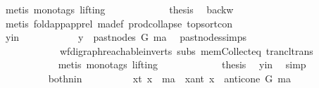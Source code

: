 \begin{isabellebody}
\ {\isacharparenleft}{\kern0pt}metis\ {\isacharparenleft}{\kern0pt}mono{\isacharunderscore}{\kern0pt}tags{\isacharcomma}{\kern0pt}\ lifting{\isacharparenright}{\kern0pt}{\isacharparenright}{\kern0pt}\ \isanewline
\ \ \ \ \ \ \ \ \isamarkupfalse%
\ \isamarkupfalse%
\ {\isacharquery}{\kern0pt}thesis\ \isamarkupfalse%
\ backw\isanewline
\ \ \ \ \ \ \ \ \ \ \isamarkupfalse%
\ {\isacharparenleft}{\kern0pt}metis\ fold{\isacharunderscore}{\kern0pt}app{\isacharunderscore}{\kern0pt}app{\isacharunderscore}{\kern0pt}rel\ ma{\isacharunderscore}{\kern0pt}def\ prod{\isachardot}{\kern0pt}collapse\ top{\isacharunderscore}{\kern0pt}sort{\isacharunderscore}{\kern0pt}con{\isacharparenright}{\kern0pt}\ \isanewline
\ \ \ \ \ \ \isamarkupfalse%
\isanewline
\ \ \ \ \ \ \isamarkupfalse%
\isanewline
\ \ \ \ \ \ \ \ \isamarkupfalse%
\ y{\isacharunderscore}{\kern0pt}in\isanewline
\ \ \ \ \ \ \ \ \isamarkupfalse%
\ \isamarkupfalse%
\ {\isachardoublequoteopen}y\ {\isasymin}\ past{\isacharunderscore}{\kern0pt}nodes\ G\ ma{\isachardoublequoteclose}\ \isamarkupfalse%
\ past{\isacharunderscore}{\kern0pt}nodes{\isachardot}{\kern0pt}simps\ \isamarkupfalse%
\ {}{\isacharparenleft}{\kern0pt}{}{\isacharcomma}{\kern0pt}{}{\isacharparenright}{\kern0pt}\isanewline
\ \ \ \ \ \ \ \ \ \ \ \ wf{\isacharunderscore}{\kern0pt}digraph{\isachardot}{\kern0pt}reachable{}{\isacharunderscore}{\kern0pt}in{\isacharunderscore}{\kern0pt}verts{\isacharparenleft}{\kern0pt}{}{\isacharparenright}{\kern0pt}\ subs\ mem{\isacharunderscore}{\kern0pt}Collect{\isacharunderscore}{\kern0pt}eq\ trancl{\isacharunderscore}{\kern0pt}trans\isanewline
\ \ \ \ \ \ \ \ \ \ \isamarkupfalse%
\ {\isacharparenleft}{\kern0pt}metis\ {\isacharparenleft}{\kern0pt}mono{\isacharunderscore}{\kern0pt}tags{\isacharcomma}{\kern0pt}\ lifting{\isacharparenright}{\kern0pt}{\isacharparenright}{\kern0pt}\ \isanewline
\ \ \ \ \ \ \ \ \isamarkupfalse%
\ \isamarkupfalse%
\ {\isacharquery}{\kern0pt}thesis\ \isamarkupfalse%
\ y{\isacharunderscore}{\kern0pt}in\ \isamarkupfalse%
\ simp\ \isanewline
\ \ \ \ \ \ \isamarkupfalse%
\isanewline
\ \ \ \ \ \ \ \ \isamarkupfalse%
\ both{\isacharunderscore}{\kern0pt}nin\isanewline
\ \ \ \ \ \ \ \ \isamarkupfalse%
\ {\isacharparenleft}{\kern0pt}x{\isacharunderscore}{\kern0pt}t{\isacharparenright}{\kern0pt}\ {\isachardoublequoteopen}x\ {\isacharequal}{\kern0pt}\ ma{\isachardoublequoteclose}\ {\isacharbar}{\kern0pt}\ {\isacharparenleft}{\kern0pt}x{\isacharunderscore}{\kern0pt}ant{\isacharparenright}{\kern0pt}\ {\isachardoublequoteopen}x\ {\isasymin}\ anticone\ G\ ma{\isachardoublequoteclose}\ \isamarkupfalse%

\end{isabellebody}
